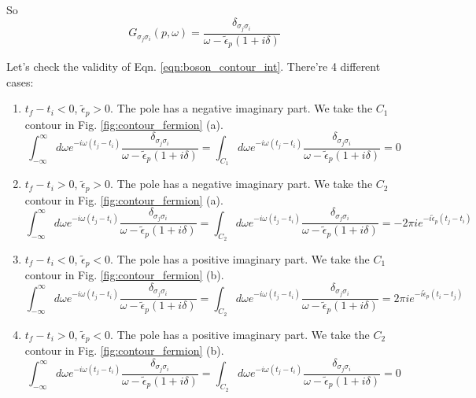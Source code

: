 \documentclass[12pt]{book}
\begin{document}
	So
	\begin{equation}
		G_{\sigma_j\sigma_i}(p,\omega)=\frac {\delta_{\sigma_j\sigma_i}}{\omega-\tilde\epsilon_p(1+i\delta)} 
	\end{equation}
	
	Let's check the validity of Eqn. \ref{eqn:boson_contour_int}. There're 4 different cases:
	\begin{enumerate}
		\item $t_f-t_i<0$, $\tilde\epsilon_p>0$. The pole has a negative imaginary part. We take the $C_1$ contour in Fig. \ref{fig:contour_fermion} (a).
			\begin{equation}
				\int_{-\infty}^\infty d\omega e^{-i\omega(t_j-t_i)}\frac {\delta_{\sigma_j\sigma_i}}{\omega-\tilde\epsilon_p(1+i\delta)}=\int_{C_1} d\omega e^{-i\omega(t_j-t_i)}\frac {\delta_{\sigma_j\sigma_i}}{\omega-\tilde\epsilon_p(1+i\delta)}=0
			\end{equation}
		\item $t_f-t_i>0$, $\tilde\epsilon_p>0$. The pole has a negative imaginary part. We take the $C_2$ contour in Fig. \ref{fig:contour_fermion} (a).
			\begin{equation}
				\int_{-\infty}^\infty d\omega e^{-i\omega(t_j-t_i)}\frac {\delta_{\sigma_j\sigma_i}}{\omega-\tilde\epsilon_p(1+i\delta)}=\int_{C_2} d\omega e^{-i\omega(t_j-t_i)}\frac {\delta_{\sigma_j\sigma_i}}{\omega-\tilde\epsilon_p(1+i\delta)}=-2\pi ie^{-i\tilde\epsilon_p(t_j-t_i)}
			\end{equation}
		\item $t_f-t_i<0$, $\tilde\epsilon_p<0$. The pole has a positive imaginary part. We take the $C_1$ contour in Fig. \ref{fig:contour_fermion} (b).
			\begin{equation}
				\int_{-\infty}^\infty d\omega e^{-i\omega(t_j-t_i)}\frac {\delta_{\sigma_j\sigma_i}}{\omega-\tilde\epsilon_p(1+i\delta)}=\int_{C_2} d\omega e^{-i\omega(t_j-t_i)}\frac {\delta_{\sigma_j\sigma_i}}{\omega-\tilde\epsilon_p(1+i\delta)}=2\pi ie^{-i\tilde\epsilon_p(t_i-t_j)}
			\end{equation}
		\item $t_f-t_i>0$, $\tilde\epsilon_p<0$. The pole has a positive imaginary part. We take the $C_2$ contour in Fig. \ref{fig:contour_fermion} (b).
			\begin{equation}
				\int_{-\infty}^\infty d\omega e^{-i\omega(t_j-t_i)}\frac {\delta_{\sigma_j\sigma_i}}{\omega-\tilde\epsilon_p(1+i\delta)}=\int_{C_2} d\omega e^{-i\omega(t_j-t_i)}\frac {\delta_{\sigma_j\sigma_i}}{\omega-\tilde\epsilon_p(1+i\delta)}=0
			\end{equation}
	\end{enumerate}
	
\end{document}
